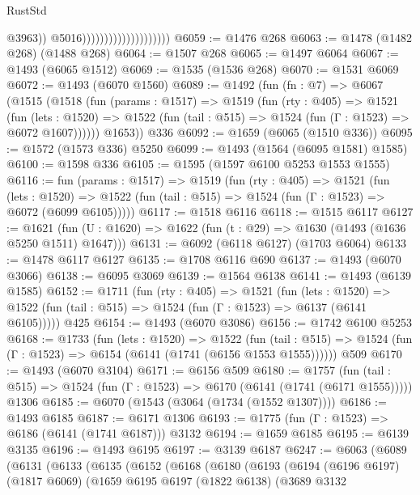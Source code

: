 \begin{lexlean}{RustStd}
\begin{coremodule}
                                                @3963))
                                            @5016))))))))))))))))))))
@6059 := @1476 @268
@6063 := @1478 (@1482 @268) (@1488 @268)
@6064 := @1507 @268
@6065 := @1497 @6064
@6067 := @1493 (@6065 @1512)
@6069 := @1535 (@1536 @268)
@6070 := @1531 @6069
@6072 := @1493 (@6070 @1560)
@6089 := @1492
    (fun (fn : @7) =>
    @6067
      (@1515
        (@1518
          (fun (params : @1517) =>
          @1519
            (fun (rty : @405) =>
            @1521
              (fun (lets : @1520) =>
              @1522 (fun (tail : @515) => @1524 (fun (Γ : @1523) => @6072 @1607))))))
        @1653))
    @336
@6092 := @1659 (@6065 (@1510 @336))
@6095 := @1572 (@1573 @336) @5250
@6099 := @1493 (@1564 (@6095 @1581) @1585)
@6100 := @1598 @336
@6105 := @1595 (@1597 @6100 @5253 @1553 @1555)
@6116 := fun (params : @1517) =>
  @1519
    (fun (rty : @405) =>
    @1521
      (fun (lets : @1520) =>
      @1522 (fun (tail : @515) => @1524 (fun (Γ : @1523) => @6072 (@6099 @6105)))))
@6117 := @1518 @6116
@6118 := @1515 @6117
@6127 := @1621 (fun (U : @1620) => @1622 (fun (t : @29) => @1630 (@1493 (@1636 @5250 @1511) @1647)))
@6131 := @6092 (@6118 @6127) (@1703 @6064)
@6133 := @1478 @6117 @6127
@6135 := @1708 @6116 @690
@6137 := @1493 (@6070 @3066)
@6138 := @6095 @3069
@6139 := @1564 @6138
@6141 := @1493 (@6139 @1585)
@6152 := @1711
    (fun (rty : @405) =>
    @1521
      (fun (lets : @1520) =>
      @1522 (fun (tail : @515) => @1524 (fun (Γ : @1523) => @6137 (@6141 @6105)))))
    @425
@6154 := @1493 (@6070 @3086)
@6156 := @1742 @6100 @5253
@6168 := @1733
    (fun (lets : @1520) =>
    @1522
      (fun (tail : @515) => @1524 (fun (Γ : @1523) => @6154 (@6141 (@1741 (@6156 @1553 @1555))))))
    @509
@6170 := @1493 (@6070 @3104)
@6171 := @6156 @509
@6180 := @1757
    (fun (tail : @515) => @1524 (fun (Γ : @1523) => @6170 (@6141 (@1741 (@6171 @1555)))))
    @1306
@6185 := @6070 (@1543 (@3064 (@1734 (@1552 @1307))))
@6186 := @1493 @6185
@6187 := @6171 @1306
@6193 := @1775 (fun (Γ : @1523) => @6186 (@6141 (@1741 @6187))) @3132
@6194 := @1659 @6185
@6195 := @6139 @3135
@6196 := @1493 @6195
@6197 := @3139 @6187
@6247 := @6063
    (@6089
      (@6131
        (@6133
          (@6135
            (@6152
              (@6168
                (@6180
                  (@6193
                    (@6194
                      (@6196 @6197)
                      (@1817 @6069)
                      (@1659
                        @6195
                        @6197
                        (@1822 @6138)
                        (@3689
                          @3132

\end{coremodule}
\end{lexlean}
